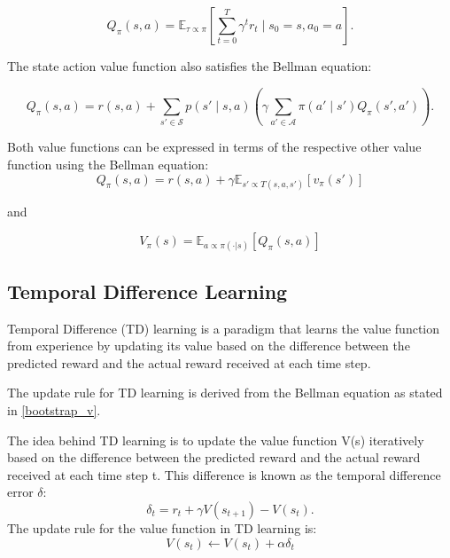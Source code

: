 \begin{equation}
    Q_{\pi}(s, a) = \mathbb{E}_{\tau \propto \pi}\left[\sum_{t=0}^T \gamma^t r_t \mid s_0 = s, a_0=a\right].
\end{equation}

The state action value function also satisfies the Bellman equation:

\begin{equation}
    \label{bmeq_q}
    Q_{\pi}(s,a) = r(s,a) + \sum_{s' \in \mathcal{S}} p(s' \mid s,a) \left(\gamma \sum_{a' \in \mathcal{A}} \pi(a' \mid s') Q_{\pi}(s',a')\right).
\end{equation}

Both value functions can be expressed in terms of the respective other value function using the Bellman equation:
\begin{equation}
    \label{q_from_v}
    Q_{\pi}(s,a) = r(s,a) + \gamma \mathbb{E}_{s'\propto T(s,a,s')}\left[ v_{\pi}(s') \right]
\end{equation}

and 

\begin{equation}
    V_{\pi}(s) = \mathbb{E}_{a \propto \pi(\cdot|s)} \left[ Q_\pi(s,a) \right]
\end{equation}



\subsection{Temporal Difference Learning}
\label{subsection:TD_learning}
Temporal Difference (TD) learning is a paradigm that learns the value function from experience by updating its value based on the difference between the predicted reward and the actual reward received at each time step.

The update rule for TD learning is derived from the Bellman equation as stated in \ref{bootstrap_v}.

The idea behind TD learning is to update the value function V(s) iteratively based on the difference between the predicted reward and the actual reward received at each time step t. This difference is known as the temporal difference error $\delta$:
\begin{equation}
    \label{TD_update}
    \delta_t = r_t + \gamma V(s_{t+1}) - V(s_t).
\end{equation}
The update rule for the value function in TD learning is:
$$V(s_t) \leftarrow V(s_t) + \alpha \delta_t$$

